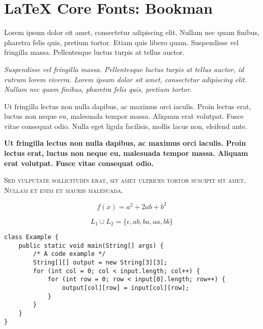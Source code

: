 \documentclass{article}
\begin{document}
\section*{LaTeX Core Fonts: Bookman}

\noindent\textrm{Lorem ipsum dolor sit amet, consectetur adipiscing elit. Nullam
nec quam finibus, pharetra felis quis, pretium tortor. Etiam quis libero quam.
Suspendisse vel fringilla massa. Pellentesque luctus turpis at tellus auctor.}

\bigskip\noindent\textit{Suspendisse vel fringilla massa. Pellentesque luctus
turpis at tellus auctor, id rutrum lorem viverra. Lorem ipsum dolor sit amet,
consectetur adipiscing elit. Nullam nec quam finibus, pharetra felis quis,
pretium tortor.}

\bigskip\noindent\textmd{Ut fringilla lectus non nulla dapibus, ac maximus orci
iaculis. Proin lectus erat, luctus non neque eu, malesuada tempor massa. Aliquam
erat volutpat. Fusce vitae consequat odio. Nulla eget ligula facilisis, mollis
lacus non, eleifend ante.}

\bigskip\noindent\textbf{Ut fringilla lectus non nulla dapibus, ac maximus orci
iaculis. Proin lectus erat, luctus non neque eu, malesuada tempor massa. Aliquam
erat volutpat. Fusce vitae consequat odio.}

\bigskip\noindent\textsc{Sed vulputate sollicitudin erat, sit amet ultrices
tortor suscipit sit amet. Nullam et enim et mauris malesuada.} 

\bigskip

\begin{equation}
    f(x) = a^2 + 2ab + b^2
\end{equation}

\begin{equation}
    L_1 \cup L_2 = \{\epsilon, ab, ba, aa, bb\}
\end{equation}

\bigskip

\begin{verbatim}
class Example {
    public static void main(String[] args) {
        /* A code example */
        String[][] output = new String[3][3];
        for (int col = 0; col < input.length; col++) {
            for (int row = 0; row < input[0].length; row++) {
                output[col][row] = input[col][row];
            }
        }
    }
}
\end{verbatim}
\end{document}
